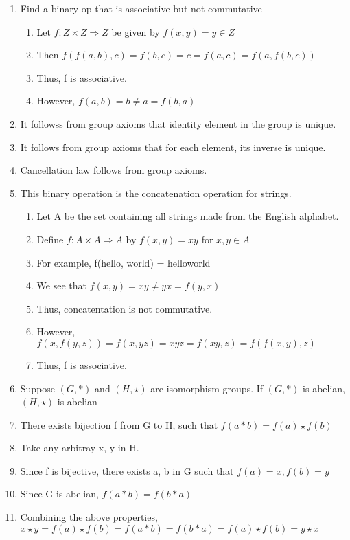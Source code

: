 \documentclass{article}
\begin{document}
\begin{enumerate}
\item Find a binary op that is associative but not commutative
\begin{enumerate}
\item Let $ f: Z \times Z \Rightarrow Z $ be given by  $ f(x, y) = y \in Z $
\item Then $ f(f(a, b), c) = f(b, c) = c = f(a, c) = f(a, f(b, c)) $
\item Thus, f is associative.
\item However, $ f(a, b) = b \neq a = f(b, a) $

\end{enumerate}

\item It followss from group axioms that identity element in the group is
unique.
\item It follows from group axioms that for each element, its inverse is unique.
\item Cancellation law follows from group axioms.

\item This binary operation is the concatenation operation for strings.
\begin{enumerate}
\item Let A be the set containing all strings made from the English alphabet.

\item Define $ f: A \times A \Rightarrow A $ by $ f(x, y) = xy $ for $ x, y \in A $

\item For example, f(hello, world) = helloworld
\item We see that $ f(x, y) = xy \neq yx = f(y, x) $
\item Thus, concatentation is not commutative.

\item However, $f(x, f(y, z)) = f(x, yz) = xyz = f(xy, z) = f(f(x, y), z) $

\item Thus, f is associative.

\end{enumerate}

\item Suppose $(G, \ast) $ and $(H, \star)$ are isomorphism groups. If $(G, \ast)$ is abelian, $(H, \star) $ is abelian

\item There exists bijection f from G to H, such that $ f(a \ast b) = f(a)\star f(b) $
\item Take any arbitray x, y in H.
\item Since f is bijective, there exists a, b in G such that $ f(a) = x, f(b) = y $
\item Since G is abelian, $ f(a \ast b) = f(b \ast a) $
\item Combining the above properties, $ x \star y = f(a) \star f(b) = f(a \ast b) = f(b \ast a) = f(a) \star f(b) = y \star x $

\end{enumerate}
\end{document}
